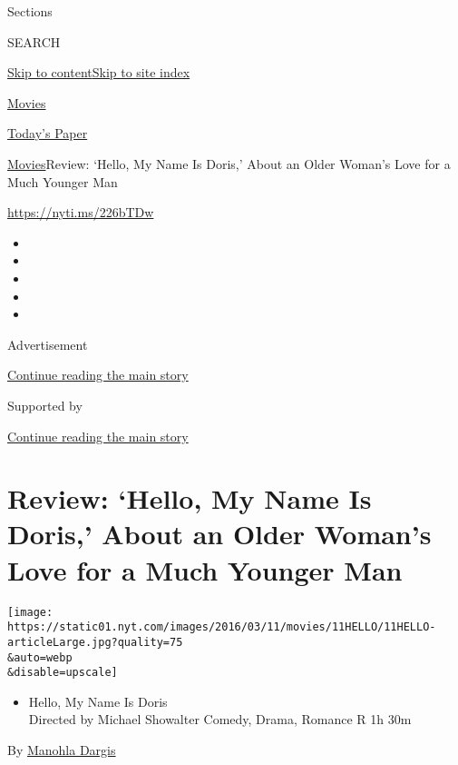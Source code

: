 Sections

SEARCH

\protect\hyperlink{site-content}{Skip to
content}\protect\hyperlink{site-index}{Skip to site index}

\href{https://www.nytimes.com/section/movies}{Movies}

\href{https://myaccount.nytimes.com/auth/login?response_type=cookie\&client_id=vi}{}

\href{https://www.nytimes.com/section/todayspaper}{Today's Paper}

\href{/section/movies}{Movies}\textbar{}Review: `Hello, My Name Is
Doris,' About an Older Woman's Love for a Much Younger Man

\href{https://nyti.ms/226bTDw}{https://nyti.ms/226bTDw}

\begin{itemize}
\item
\item
\item
\item
\item
\end{itemize}

Advertisement

\protect\hyperlink{after-top}{Continue reading the main story}

Supported by

\protect\hyperlink{after-sponsor}{Continue reading the main story}

\hypertarget{review-hello-my-name-is-doris-about-an-older-womans-love-for-a-much-younger-man}{%
\section{Review: `Hello, My Name Is Doris,' About an Older Woman's Love
for a Much Younger
Man}\label{review-hello-my-name-is-doris-about-an-older-womans-love-for-a-much-younger-man}}

\texttt{[image: https://static01.nyt.com/images/2016/03/11/movies/11HELLO/11HELLO-articleLarge.jpg?quality=75\\\&auto=webp\\\&disable=upscale]}

\begin{itemize}
\tightlist
\item
  Hello, My Name Is Doris\\
  Directed by Michael Showalter Comedy, Drama, Romance R 1h 30m
\end{itemize}

By \href{https://www.nytimes.com/by/manohla-dargis}{Manohla Dargis}

